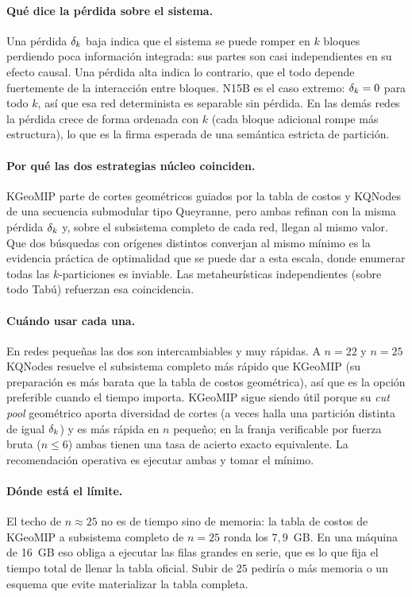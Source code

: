 \documentclass[11pt,letterpaper]{article}
\begin{document}
\paragraph{Qué dice la pérdida sobre el sistema.} Una pérdida $\delta_k$ baja indica que
el sistema se puede romper en $k$ bloques perdiendo poca información integrada: sus
partes son casi independientes en su efecto causal. Una pérdida alta indica lo
contrario, que el todo depende fuertemente de la interacción entre bloques. N15B es
el caso extremo: $\delta_k=0$ para todo $k$, así que esa red determinista es separable
sin pérdida. En las demás redes la pérdida crece de forma ordenada con $k$ (cada
bloque adicional rompe más estructura), lo que es la firma esperada de una semántica
estricta de partición.

\paragraph{Por qué las dos estrategias núcleo coinciden.} KGeoMIP parte de cortes
geométricos guiados por la tabla de costos y KQNodes de una secuencia submodular tipo
Queyranne, pero ambas refinan con la misma pérdida $\delta_k$ y, sobre el subsistema
completo de cada red, llegan al mismo valor. Que dos búsquedas con orígenes distintos
converjan al mismo mínimo es la evidencia práctica de optimalidad que se puede dar a
esta escala, donde enumerar todas las $k$-particiones es inviable. Las metaheurísticas
independientes (sobre todo Tabú) refuerzan esa coincidencia.

\paragraph{Cuándo usar cada una.} En redes pequeñas las dos son intercambiables y muy
rápidas. A $n=22$ y $n=25$ KQNodes resuelve el subsistema completo más rápido que
KGeoMIP (su preparación es más barata que la tabla de costos geométrica), así que es
la opción preferible cuando el tiempo importa. KGeoMIP sigue siendo útil porque su
\emph{cut pool} geométrico aporta diversidad de cortes (a veces halla una partición
distinta de igual $\delta_k$) y es más rápida en $n$ pequeño; en la franja verificable por
fuerza bruta ($n\le 6$) ambas tienen una tasa de acierto exacto equivalente. La
recomendación operativa es ejecutar ambas y tomar el mínimo.

\paragraph{Dónde está el límite.} El techo de $n\approx 25$ no es de tiempo sino de
memoria: la tabla de costos de KGeoMIP a subsistema completo de $n=25$ ronda los
$7{,}9$~GB. En una máquina de 16~GB eso obliga a ejecutar las filas grandes en serie,
que es lo que fija el tiempo total de llenar la tabla oficial. Subir de $25$ pediría
o más memoria o un esquema que evite materializar la tabla completa.
\end{document}
